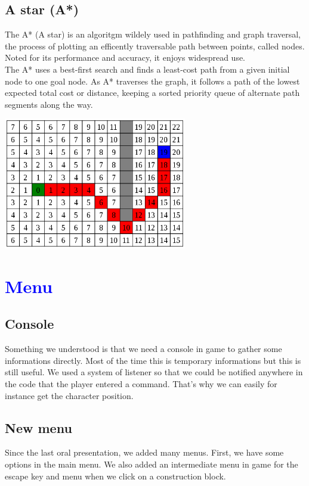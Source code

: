 \documentclass[article]{report}             %
\begin{document}
			\section{A star (A*)}
				The A* (A star) is an algoritgm wildely used in pathfinding and graph traversal, the process of plotting an efficently traversable path between points, called nodes. Noted for its performance and accuracy, it enjoys widespread use.\\
 The A* uses a best-first search and finds a least-cost path from a given initial node to one goal node. As A* traverses the graph, it follows a path of the lowest expected total cost or distance, keeping a sorted priority queue of alternate path segments along the way. \\
			\begin{center}
				\includegraphics[width = 8cm]{images/Graphics/AStar.png}	
			\end{center}		
\chapter{\textcolor{blue}{Menu}}
			\section{Console}
				Something we understood is that we need a console in game to gather some informations directly. Most 
of the time this is temporary informations but this is still useful.  We used a system of listener so that we 
could be notified anywhere in the code that the player entered a command.  That’s why we can easily for 
instance get the character position.  \\

			\section{New menu}
				Since the last oral presentation, we added many menus.  First, we have some options in the main menu. 
We also added an intermediate menu in game for the escape key and menu when we click on a construction 
block.  \\
\end{document}
